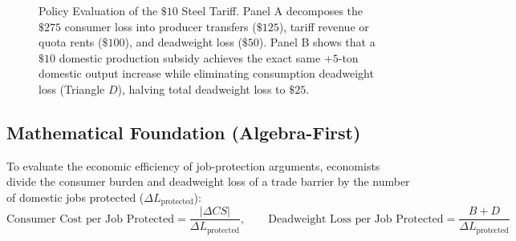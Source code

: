 \documentclass[11pt,letterpaper]{article}
\begin{document}
\begin{figure}[htbp]
\caption{Policy Evaluation of the $\$10$ Steel Tariff. Panel A decomposes the $\$275$ consumer loss into producer transfers ($\$125$), tariff revenue or quota rents ($\$100$), and deadweight loss ($\$50$). Panel B shows that a $\$10$ domestic production subsidy achieves the exact same $+5$-ton domestic output increase while eliminating consumption deadweight loss (Triangle $D$), halving total deadweight loss to $\$25$.}
\label{fig:tariff_vs_subsidy_policy}
\end{figure}

\subsection*{Mathematical Foundation (Algebra-First)}
To evaluate the economic efficiency of job-protection arguments, economists divide the consumer burden and deadweight loss of a trade barrier by the number of domestic jobs protected ($\Delta L_{\text{protected}}$):
\begin{equation}
\text{Consumer Cost per Job Protected} = \frac{|\Delta CS|}{\Delta L_{\text{protected}}}, \qquad \text{Deadweight Loss per Job Protected} = \frac{B + D}{\Delta L_{\text{protected}}}
\end{equation}
\end{document}
